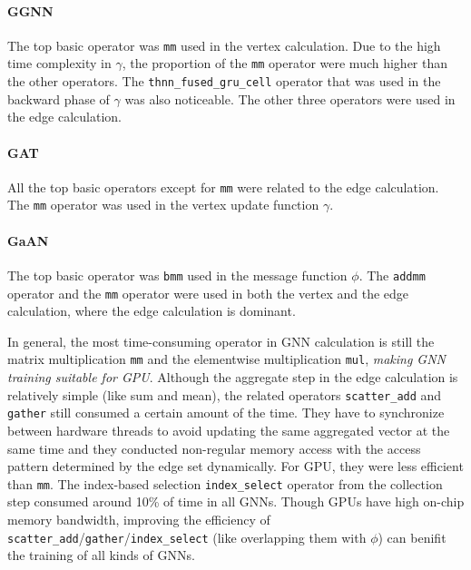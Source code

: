 \paragraph{GGNN}
The top basic operator was \texttt{mm} used in the vertex calculation.
Due to the high time complexity in $\gamma$, the proportion of the \texttt{mm} operator were much higher than the other operators.
The \texttt{thnn\_fused\_gru\_cell} operator that was used in the backward phase of $\gamma$ was also noticeable.
The other three operators were used in the edge calculation.

\paragraph{GAT}
All the top basic operators except for \texttt{mm} were related to the edge calculation.
The \texttt{mm} operator was used in the vertex update function $\gamma$.

\paragraph{GaAN}
The top basic operator was \texttt{bmm} used in the message function $\phi$. 
The \texttt{addmm} operator and the \texttt{mm} operator were used in both the vertex and the edge calculation, where the edge calculation is dominant.

In general, the most time-consuming operator in GNN calculation is still the matrix multiplication \texttt{mm} and the elementwise multiplication \texttt{mul}, \emph{making GNN training suitable for GPU}.
Although the aggregate step in the edge calculation is relatively simple (like sum and mean), the related operators \texttt{scatter\_add} and \texttt{gather} still consumed a certain amount of the time.
They have to synchronize between hardware threads to avoid updating the same aggregated vector at the same time and they conducted non-regular memory access with the access pattern determined by the edge set dynamically.
For GPU, they were less efficient than \texttt{mm}.
The index-based selection \texttt{index\_select} operator from the collection step consumed around 10\% of time in all GNNs.
Though GPUs have high on-chip memory bandwidth, improving the efficiency of \texttt{scatter\_add}/\texttt{gather}/\texttt{index\_select} (like overlapping them with $\phi$) can benifit the training of all kinds of GNNs.

